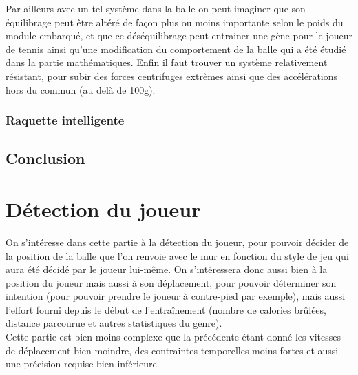 Par ailleurs avec un tel système dans la balle on peut imaginer que son équilibrage peut être altéré de façon plus ou moins importante selon le poids du module embarqué, et que ce déséquilibrage peut entrainer une gène pour le joueur de tennis ainsi qu'une modification du comportement de la balle qui a été étudié dans la partie mathématiques. Enfin il faut trouver un système relativement résistant, pour subir des forces centrifuges extrèmes ainsi que des accélérations hors du commun (au delà de 100g).

\subsection{Raquette intelligente}













\section{Conclusion}






















\chapter{Détection du joueur}

On s'intéresse dans cette partie à la détection du joueur, pour pouvoir décider de la position de la balle que l'on renvoie avec le mur en fonction du style de jeu qui aura été décidé par le joueur lui-même. On s'intéressera donc aussi bien à la position du joueur mais aussi à son déplacement, pour pouvoir déterminer son intention (pour pouvoir prendre le joueur à contre-pied par exemple), mais aussi l'effort fourni depuis le début de l'entraînement (nombre de calories brûlées, distance parcourue et autres statistiques du genre). \\

Cette partie est bien moins complexe que la précédente étant donné les vitesses de déplacement bien moindre, des contraintes temporelles moins fortes et aussi une précision requise bien inférieure.


